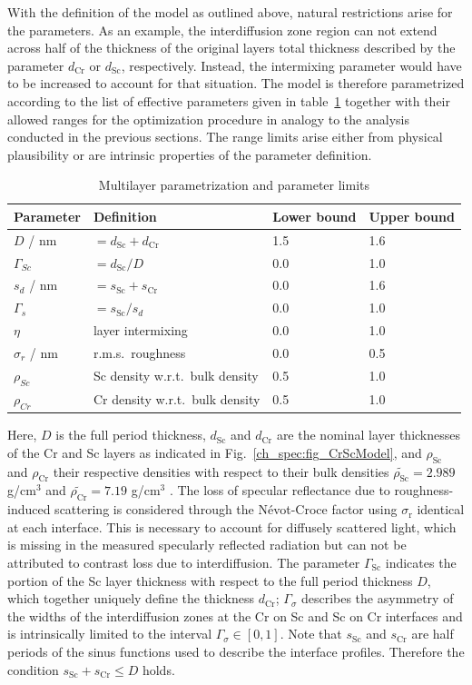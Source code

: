With the definition of the model as outlined above, natural restrictions arise for the parameters. As an example, the interdiffusion zone region can not extend across half of the thickness of the original layers total thickness described by the parameter $d_\text{Cr}$ or $d_\text{Sc}$, respectively. Instead, the intermixing parameter would have to be increased to account for that situation. The model is therefore parametrized according to the list of effective parameters given in table~\ref{ch_spec:tbl_CrSc_gradual_parametrization} together with their allowed ranges for the optimization procedure in analogy to the analysis conducted in the previous sections. The range limits arise either from physical plausibility or are intrinsic properties of the parameter definition.
\begin{table}[htbp]
\centering
\caption{Multilayer parametrization and parameter limits}
\label{ch_spec:tbl_CrSc_gradual_parametrization}
\begin{tabular}{@{}llll@{}}
\toprule
Parameter & Definition & Lower bound & Upper bound\\ \midrule
$D$ / nm & $= d_\text{Sc} + d_\text{Cr}$ & 1.5&1.6 \\ 
$\Gamma_{Sc}$ & $= d_\text{Sc} / D$&0.0 &1.0 \\ 
$s_d$ / nm&$=s_\text{Sc} + s_\text{Cr}$&0.0 & 1.6\\ 
$\Gamma_s$ &$= s_\text{Sc} / s_d$& 0.0& 1.0\\ 
$\eta$ &layer intermixing& 0.0& 1.0\\ 
$\sigma_r$ / nm & r.m.s.~roughness& 0.0& 0.5\\ 
$\rho_{Sc}$ &Sc density w.r.t.~bulk density & 0.5& 1.0\\ 
$\rho_{Cr}$ &Cr density w.r.t.~bulk density& 0.5& 1.0\\ 
 \bottomrule
\end{tabular}
\end{table}
Here, $D$ is the full period thickness, $d_\text{Sc}$ and $d_\text{Cr}$ are the 
nominal layer thicknesses of the Cr and Sc layers as indicated in 
Fig.~\ref{ch_spec:fig_CrScModel}, and $\rho_\text{Sc}$ and $\rho_\text{Cr}$ their 
respective densities with respect to their bulk densities 
$\tilde{\rho_\text{Sc}} = 2.989$ g/cm$^3$ and $\tilde{\rho_\text{Cr}} = 7.19$ 
g/cm$^3$ \cite{henke_x-ray_1993}. The loss of specular 
reflectance due to roughness-induced scattering is considered through the 
N\'{e}vot-Croce factor using $\sigma_\text{r}$ identical at each interface. This is necessary to account for diffusely scattered light, which is missing in the measured specularly reflected radiation but can not be attributed to contrast loss due to interdiffusion. The parameter $\Gamma_\text{Sc}$ indicates the portion of the Sc layer thickness 
with respect to the full period thickness $D$, which together uniquely define the thickness $d_\text{Cr}$; $\Gamma_\sigma$ describes the 
asymmetry of the widths of the interdiffusion zones at the Cr on Sc and Sc on Cr 
interfaces and is intrinsically limited to the interval $\Gamma_\sigma \in [0,1]$. Note that 
$s_\text{Sc}$ and $s_\text{Cr}$ are half periods of the sinus functions used to 
describe the interface profiles. Therefore the condition $s_\text{Sc} + 
s_\text{Cr} \leq D$ holds.

